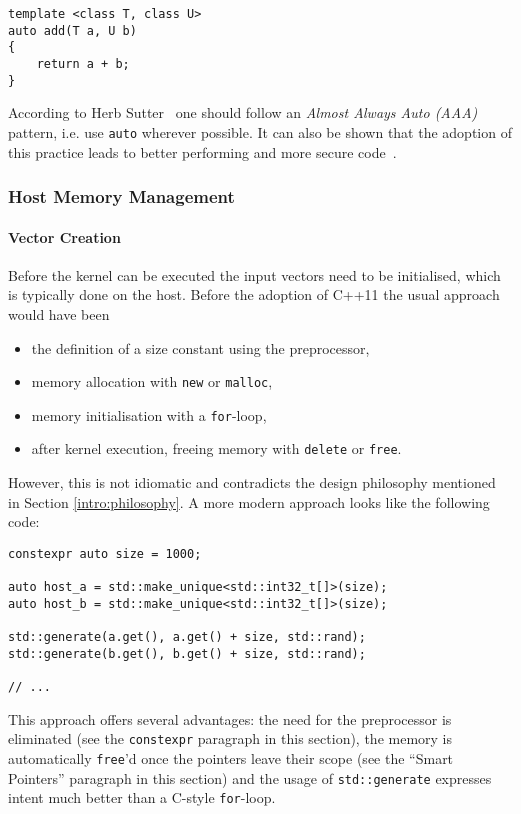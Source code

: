 \begin{verbatim}
template <class T, class U>
auto add(T a, U b)
{
    return a + b;
}
\end{verbatim}

\noindent According to Herb Sutter~\cite{sutteraaa} one should follow an \textit{Almost Always Auto (AAA)} pattern, i.e. use \texttt{auto} wherever possible. It can also be shown that the adoption of this practice leads to better performing and more secure code~\cite{sutter_cppcon}.

\subsubsection{Host Memory Management}\label{modern:vec_add:host_mem}

\paragraph{Vector Creation}

Before the kernel can be executed the input vectors need to be initialised, which is typically done on the host. Before the adoption of C++11 the usual approach would have been
\begin{itemize}
\item the definition of a size constant using the preprocessor,
\item memory allocation with \texttt{new} or \texttt{malloc},
\item memory initialisation with a \texttt{for}-loop,
\item after kernel execution, freeing memory with \texttt{delete} or \texttt{free}.
\end{itemize}

\noindent However, this is not idiomatic and contradicts the design philosophy mentioned in Section \ref{intro:philosophy}. A more modern approach looks like the following code:

\begin{verbatim}
constexpr auto size = 1000;

auto host_a = std::make_unique<std::int32_t[]>(size);
auto host_b = std::make_unique<std::int32_t[]>(size);

std::generate(a.get(), a.get() + size, std::rand);
std::generate(b.get(), b.get() + size, std::rand);

// ...
\end{verbatim}

\noindent This approach offers several advantages: the need for the preprocessor is eliminated (see the \texttt{constexpr} paragraph in this section), the memory is automatically \texttt{free}'d once the pointers leave their scope (see the ``Smart Pointers'' paragraph in this section) and the usage of \texttt{std::generate} expresses intent much better than a C-style \texttt{for}-loop.

